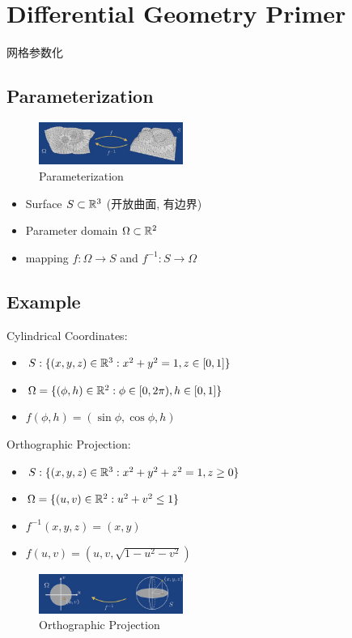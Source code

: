\newpage
\section{Differential Geometry Primer}
网格参数化
\subsection{Parameterization}
\begin{figure}[!htb]
    \centering
    \includegraphics[width=0.42\textwidth]{pic/ACG2/Parameterization}
    \caption{Parameterization}
\end{figure}

\begin{itemize}
    \item Surface $S\subset \mathbb{R}^3$ (开放曲面, 有边界)
    \item Parameter domain $\Omega\subset \mathbb{R}^2$
    \item mapping $f:\Omega\to S$ and $f^{-1}:S\to \Omega$
\end{itemize}

\subsection{Example}
Cylindrical Coordinates:
\begin{itemize}
    \item $S:\{ (x,y,z)\in \mathbb{R}^3: x^2+y^2=1, z\in[0,1] \}$
    \item $\Omega=\{ (\phi, h)\in \mathbb{R}^2:\phi\in[0,2\pi), h\in[0,1] \}$
    \item $f(\phi, h)=(\sin\phi, \cos\phi, h)$
\end{itemize}

Orthographic Projection:
\begin{itemize}
    \item $S:\{ (x,y,z)\in \mathbb{R}^3: x^2+y^2+z^2=1, z\ge 0 \}$
    \item $\Omega=\{ (u, v)\in \mathbb{R}^2:u^2+v^2\le 1 \}$
    \item $f^{-1}(x,y,z)=(x,y)$
    \item $f(u,v)=(u,v,\sqrt{1-u^2-v^2})$
\end{itemize}

\begin{figure}[!htb]
    \centering
    \includegraphics[width=0.42\textwidth]{pic/ACG2/Orthographic Projection}
    \caption{Orthographic Projection}
\end{figure}


